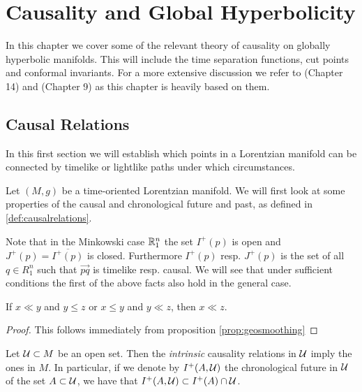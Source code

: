 \chapter{Causality and Global Hyperbolicity}\label{chap:causality}
In this chapter we cover some of the relevant theory of causality on globally hyperbolic manifolds. This will include the time separation functions, cut points and conformal invariants. For a more extensive discussion we refer to \cite{oneill}(Chapter 14) and \cite{beem}(Chapter 9) as this chapter is heavily based on them.

\section{Causal Relations}
In this first section we will establish which points in a Lorentzian manifold can be connected by timelike or lightlike paths under which circumstances. 

Let $(M,g)$ be a time-oriented Lorentzian manifold. We will first look at some properties of the causal and chronological future and past, as defined in \ref{def:causalrelations}.

Note that in the Minkowski case $\mathbb{R}^n_1$ the set $I^+(p)$ is open and $J^+(p)=\overline{I^+(p)}$ is closed. Furthermore $I^+(p)$ resp. $J^+(p)$ is the set of all $q\in R^n_1$ such that $\overrightarrow{pq}$ is timelike resp. causal.
We will see that under sufficient conditions the first of the above facts also hold in the general case.

\begin{corollary}
If $x\ll y$ and $y\leq z$ or $x\leq y$ and $y\ll z$, then $x\ll z$.
\end{corollary}
\begin{proof}
This follows immediately from proposition \ref{prop:geosmoothing}
\end{proof}

Let $\mathcal{U} \subset M$ be an open set. Then the \emph{intrinsic} causality relations in $\mathcal{U}$ imply the ones in $M$. In particular, if we denote by $I^+(A,\mathcal{U})$ the chronological future in $\mathcal{U}$ of the set $A\subset\mathcal{U}$, we have that $I^+(A,\mathcal{U}) \subset I^+(A)\cap \mathcal{U}$.

